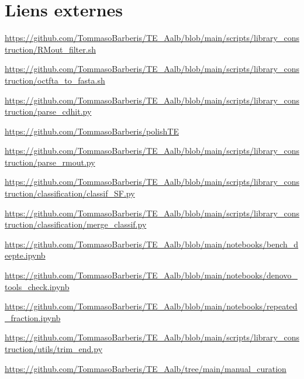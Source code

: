 \documentclass[10pt]{article}
\begin{document}
\renewcommand{\theexternallinksection}{Liens externes}
\label{s:ext}
\section*{Liens externes}

\begin{link}\label{link1}
\url{https://github.com/TommasoBarberis/TE_Aalb/blob/main/scripts/library_construction/RMout_filter.sh}
\end{link}

\begin{link}\label{link2}
\url{https://github.com/TommasoBarberis/TE_Aalb/blob/main/scripts/library_construction/octfta_to_fasta.sh}
\end{link}

\begin{link}\label{link3}
\url{https://github.com/TommasoBarberis/TE_Aalb/blob/main/scripts/library_construction/parse_cdhit.py}
\end{link}

\begin{link}\label{link4}
\url{https://github.com/TommasoBarberis/polishTE}
\end{link}

\begin{link}\label{link5}
\url{https://github.com/TommasoBarberis/TE_Aalb/blob/main/scripts/library_construction/parse_rmout.py}
\end{link}

\begin{link}\label{link6}
\url{https://github.com/TommasoBarberis/TE_Aalb/blob/main/scripts/library_construction/classification/classif_SF.py}
\end{link}

\begin{link}\label{link7}
\url{https://github.com/TommasoBarberis/TE_Aalb/blob/main/scripts/library_construction/classification/merge_classif.py}
\end{link}

\begin{link}\label{link8}
\url{https://github.com/TommasoBarberis/TE_Aalb/blob/main/notebooks/bench_deepte.ipynb}
\end{link}

\begin{link}\label{link9}
\url{https://github.com/TommasoBarberis/TE_Aalb/blob/main/notebooks/denovo_tools_check.ipynb}
\end{link}

\begin{link}\label{link10}
\url{https://github.com/TommasoBarberis/TE_Aalb/blob/main/notebooks/repeated_fraction.ipynb}
\end{link}

\begin{link}\label{link11}
\url{https://github.com/TommasoBarberis/TE_Aalb/blob/main/scripts/library_construction/utils/trim_end.py}
\end{link}

\begin{link}\label{link12}
\url{https://github.com/TommasoBarberis/TE_Aalb/tree/main/manual_curation}
\end{link}
\end{document}
